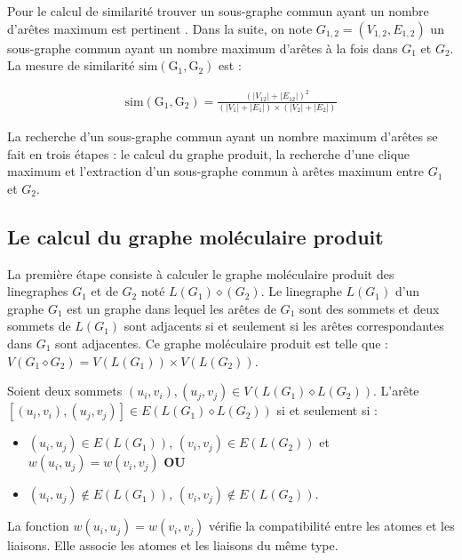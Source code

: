 Pour le calcul de similarité trouver un sous-graphe commun ayant un nombre d'arêtes maximum  est pertinent \cite{rascal}. Dans la suite, on note $G_{1,2}=(V_{1,2},E_{1,2})$ un sous-graphe commun ayant un nombre maximum d'arêtes à la fois dans $G_1$ et $G_2$. La mesure de similarité $\mathrm{sim(G_{1},G_{2})}$ est :

\begin{eqnarray}
\mathrm{sim(G_{1},G_{2}) }= \frac{(|V _{12}| + |E _{12}| )^2 }{(|V _1| + |E_1| )\times (|V_2| + |E _2| )}
\label{eq:mces}
\end{eqnarray}

La recherche d'un sous-graphe commun ayant un nombre maximum d'arêtes se fait en trois étapes : le calcul du graphe produit, la recherche d'une clique maximum et l'extraction d'un sous-graphe commun à arêtes maximum entre $G_1$ et $G_2$.

\subsection{Le calcul du graphe moléculaire produit }

La première étape consiste à calculer le graphe moléculaire produit des linegraphes $G_1$ et de $G_2$ noté $L(G_1)\diamond (G_2)$. Le linegraphe $L(G_1)$ d'un graphe $G_1$ est un graphe dans lequel les arêtes de $G_1$ sont des sommets et deux sommets de $L(G_1)$ sont adjacents si et seulement si les arêtes correspondantes dans $G_1$ sont adjacentes.
Ce graphe moléculaire produit est telle que : $V(G_1\diamond G_2) = V(L(G_1)) \times V(L(G_2))$.

Soient deux sommets $(u_i,v_i), (u_j,v_j)  \in V(L(G_1)\diamond L(G_2))$. L'arête $[(u_i,v_i), (u_j,v_j)] \in E(L(G_1)\diamond L(G_2))$ si et seulement si :

\begin{itemize}
\item $(u_i,u_j) \in E(L(G_1))$, $(v_i,v_j) \in E(L(G_2))$ et $w(u_i,u_j)= w(v_i,v_j)$ \textbf{OU}
\item $(u_i,u_j) \notin E(L(G_1))$, $(v_i,v_j) \notin E(L(G_2))$.
\end{itemize}
La fonction $w(u_i,u_j)= w(v_i,v_j)$ vérifie la compatibilité entre les atomes et les liaisons. Elle associe les atomes et les liaisons du même type.

